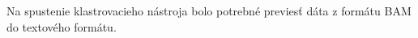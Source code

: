 Na spustenie klastrovacieho nástroja bolo potrebné previesť dáta z formátu BAM do textového formátu.

